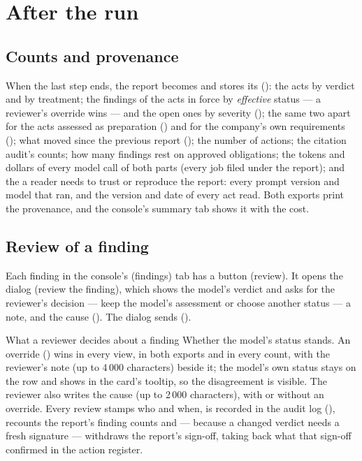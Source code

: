 \section{After the run}\label{sec:report:after}

\subsection{Counts and provenance}

When the last step ends, the report becomes  and stores its 
(): the acts by verdict and by treatment; the findings of the acts in force
by \emph{effective} status --- a reviewer's override wins --- and the open ones by severity
(); the same two apart for the acts assessed as preparation
() and for the company's own requirements (); what moved since the
previous report (); the number of actions; the citation audit's counts; how many
findings rest on approved obligations; the tokens and dollars of every model call of
both parts (every job filed under the report); and the  a reader needs to trust
or reproduce the report: every prompt version and model that ran, and the version and date of
every act read. Both exports print the provenance, and the console's summary tab shows it with
the cost.

\subsection{Review of a finding}

Each finding in the console's  (findings) tab has a button 
(review). It opens the dialog  (review the finding), which shows the
model's verdict and asks for the reviewer's decision --- keep the model's assessment or choose
another status --- a note, and the cause (). The
dialog sends  ().

\begin{humanbox}{What a reviewer decides about a finding}
Whether the model's status stands. An override () wins in every view, in
both exports and in every count, with the reviewer's note (up to 4\,000 characters) beside it;
the model's own status stays on the row and shows in the card's tooltip, so the disagreement is
visible. The reviewer also writes the cause (up to 2\,000 characters), with or without an
override. Every review stamps who and when, is recorded in the audit log
(), recounts the report's finding counts and --- because a changed
verdict needs a fresh signature --- withdraws the report's sign-off, taking back what that
sign-off confirmed in the action register.
\end{humanbox}

